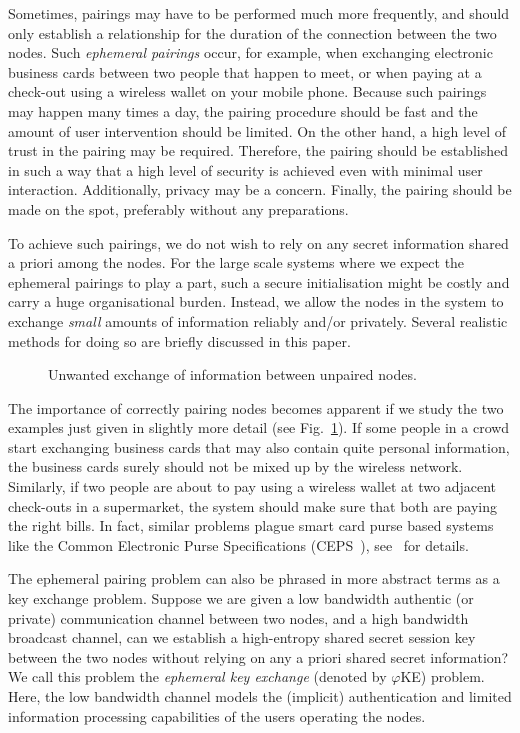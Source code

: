 \documentclass[runningheads,envcountsame,envcountsect,oribibl]{llncs}
\newcommand{\eke}{$\varphi$KE}
\begin{document}
Sometimes, pairings may have to be performed much more frequently, and should
only establish a relationship for the duration of the connection between the
two nodes.  Such \emph{ephemeral pairings} occur, for example, when exchanging
electronic business cards between two people that happen to meet, or when
paying at a check-out using a wireless wallet on your mobile phone. Because
such pairings may happen many times a day, the pairing procedure should be fast
and the amount of user intervention should be limited. On the other hand,
a high level of trust in the pairing may be required. Therefore, 
the pairing should be established in such a way that a high level of security
is achieved even with minimal user interaction. Additionally, privacy may be a
concern. Finally, the pairing should be made on the spot, preferably without
any preparations. 

To achieve such pairings, we do not wish to rely on any secret
information shared a priori among the nodes. For the large scale systems
where we expect the ephemeral pairings to play a part, such a secure
initialisation might be costly and carry a huge organisational burden. Instead,
we allow the nodes in the system to exchange \emph{small} amounts of
information reliably and/or privately. Several realistic methods for doing so
are briefly discussed in this paper.

\begin{figure}[t]
\begin{center}
\end{center}
\caption{Unwanted exchange of information between unpaired nodes.}
\label{fig-swap}
\end{figure}

The importance of correctly pairing nodes becomes apparent if we study the two
examples just given in slightly more detail (see Fig.~\ref{fig-swap}). 
If some people in a crowd start exchanging
business cards that may also contain quite personal information, the business
cards surely should not be mixed up by the wireless network. Similarly, if two
people are about to pay using a wireless wallet at two adjacent check-outs in a
supermarket, the system should make sure that both are paying the right bills.
In fact, similar problems plague smart card purse based systems like
the Common Electronic Purse Specifications (CEPS~\cite{CEPS01}),
see~\cite{JurW01} for details. 



The ephemeral pairing problem can also be phrased in more abstract terms as a
key exchange problem. Suppose we are given a low bandwidth authentic (or
private) communication channel between two nodes, and a high bandwidth
broadcast channel, can we establish a high-entropy shared secret session key
between the two nodes without relying on any a priori shared secret
information? We call this problem the \emph{ephemeral key exchange} 
(denoted by \eke{})
problem. Here, the low bandwidth channel models the (implicit) authentication
and limited information processing capabilities of the users operating the
nodes.
\end{document}
